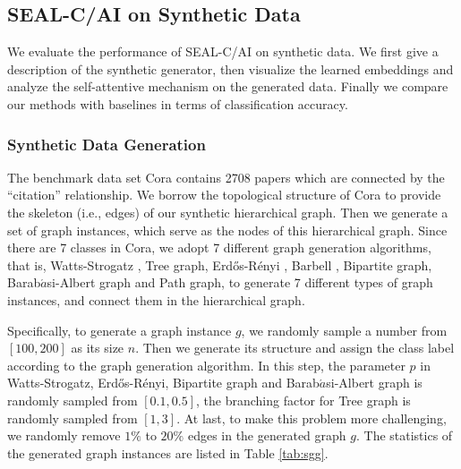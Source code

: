 \documentclass[sigconf]{acmart}
\begin{document}
\subsection{SEAL-C/AI on Synthetic Data}

We evaluate the performance of SEAL-C/AI on synthetic data.  We first give a description of the synthetic generator, then visualize the learned embeddings and analyze the self-attentive mechanism on the generated data.  Finally we compare our methods with baselines in terms of classification accuracy.

\subsubsection{Synthetic Data Generation}

The benchmark data set Cora \cite{mccallum2000automating} contains 2708 papers which are connected by the ``citation'' relationship.  We borrow the topological structure of Cora to provide the skeleton (i.e., edges) of our synthetic hierarchical graph.  Then we generate a set of graph instances, which serve as the nodes of this hierarchical graph.  Since there are 7 classes in Cora, we adopt 7 different graph generation algorithms, that is, Watts-Strogatz \cite{watts1998collective}, Tree graph, Erd{\H o}s-R{\'e}nyi \cite{erdos1960evolution}, Barbell \cite{herbster2007prediction}, Bipartite graph, Barab$\acute{a}$si-Albert graph \cite{bollobas2003mathematical} and Path graph, to generate 7 different types of graph instances, and connect them in the hierarchical graph.

Specifically, to generate a graph instance $g$, we randomly sample a number from $[100, 200]$ as its size $n$.  Then we generate its structure and assign the class label according to the graph generation algorithm.  In this step, the parameter $p$ in Watts-Strogatz, Erd{\H o}s-R{\'e}nyi, Bipartite graph and Barab$\acute{a}$si-Albert graph is randomly sampled from $[0.1, 0.5]$, the branching factor for Tree graph is randomly sampled from $[1, 3]$.  At last, to make this problem more challenging, we randomly remove $1\%$ to $20\%$ edges in the generated graph $g$.  The statistics of the generated graph instances are listed in Table \ref{tab:sgg}.
\end{document}

